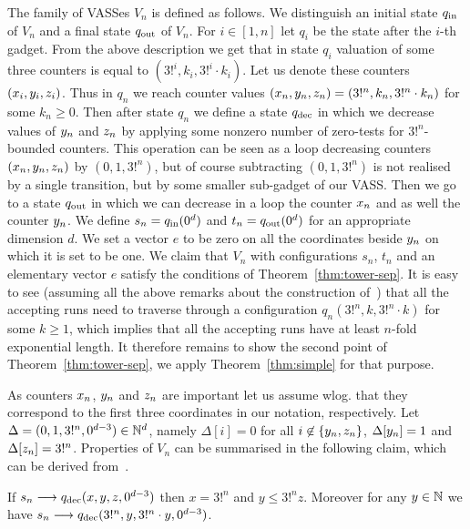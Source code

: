 The family of VASSes $V_n$ is defined as follows.
We distinguish an initial state $q_{\textup{in}}$ of $V_n$ and a final state $q_{\textup{out}}$ of $V_n$.
For $i \in [1,n]$ let $q_i$ be the state after the $i$-th gadget. From the above description we get that
in state $q_i$ valuation of some three counters is equal to $(3!^i, k_i, 3!^i \cdot k_i)$. Let us denote
these counters $(x_i, y_i, z_i)$. Thus in $q_n$ we reach counter values
$(x_n, y_n, z_n) = (3!^n, k_n, 3!^n \cdot k_n)$ for some $k_n \geq 0$.
Then after state $q_n$ we define a state $q_{\textup{dec}}$ in which we decrease values of $y_n$ and $z_n$
by applying some nonzero number of zero-tests for $3!^n$-bounded counters.
This operation can be seen as a loop decreasing counters $(x_n, y_n, z_n)$ by $(0, 1, 3!^n)$,
but of course subtracting $(0, 1, 3!^n)$ is not realised by a single transition, but by some smaller sub-gadget of our VASS.
Then we go to a state $q_{\textup{out}}$ in which we can decrease in a loop the counter $x_n$
and as well the counter $y_n$.
We define $s_n = q_{\textup{in}}(0^d)$ and $t_n = q_{\textup{out}}(0^d)$ for an appropriate dimension $d$.
We set a vector $e$ to be zero on all the coordinates beside $y_n$ on which it is set to be one.
We claim that $V_n$ with configurations $s_n$, $t_n$ and an elementary vector $e$ satisfy
the conditions of Theorem~\ref{thm:tower-sep}. It is easy to see
(assuming all the above remarks about the construction of~\cite{DBLP:conf/stoc/CzerwinskiLLLM19})
that all the accepting runs need to traverse through a configuration $q_n(3!^n, k, 3!^n \cdot k)$ for some $k \geq 1$,
which implies that all the accepting runs have at least $n$-fold exponential length.
It therefore remains to show the second point of Theorem~\ref{thm:tower-sep},
we apply Theorem~\ref{thm:simple} for that purpose.

As counters $x_n$, $y_n$ and $z_n$ are important let us assume wlog. that they correspond to the first three
coordinates in our notation, respectively.
Let $\Delta = (0, 1, 3!^n, 0^{d-3}) \in \mathbb{N}^d$, namely $\Delta[i] = 0$ for all $i \not\in \{y_n, z_n\}$, $\Delta[y_n] = 1$
and $\Delta[z_n] = 3!^n$.  Properties of $V_n$ can be summarised in the following claim, which can be
derived from~\cite{DBLP:conf/stoc/CzerwinskiLLLM19}.

\begin{claim}\label{cl:tower}
If $s_n \longrightarrow q_{\textup{dec}}(x, y, z, 0^{d-3})$ then $x = 3!^n$ and $y \leq 3!^n z$.
Moreover for any $y \in \mathbb{N}$ we have $s_n \longrightarrow q_{\textup{dec}}(3!^n, y, 3!^n \cdot y, 0^{d-3})$.
\end{claim}

